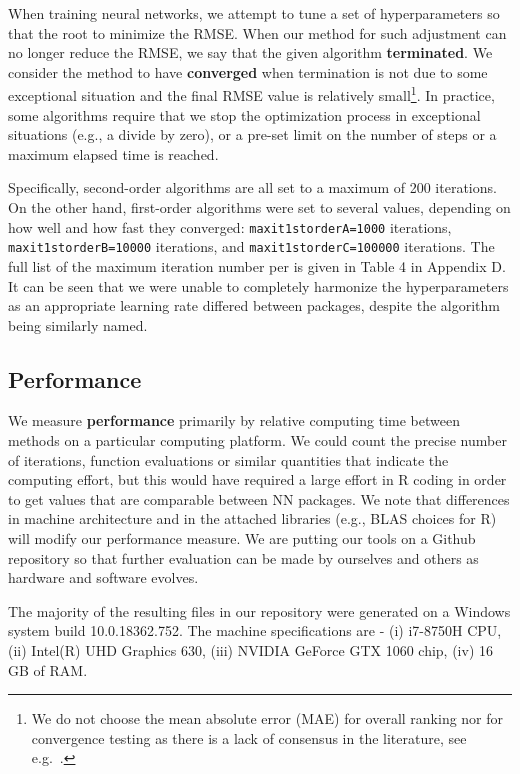 When training neural networks, we attempt to tune a set of
hyperparameters so that the root to minimize the RMSE. When our method
for such adjustment can no longer reduce the RMSE, we say that the given
algorithm \textbf{terminated}. We consider the method to have
\textbf{converged} when termination is not due to some exceptional
situation and the final RMSE value is relatively small\footnote{We do
  not choose the mean absolute error (MAE) for overall ranking nor for
  convergence testing as there is a lack of consensus in the literature,
  see e.g.~\citep{willmott2005advantages,chai2014root}.}. In practice,
some algorithms require that we stop the optimization process in
exceptional situations (e.g., a divide by zero), or a pre-set limit on
the number of steps or a maximum elapsed time is reached.

Specifically, second-order algorithms are all set to a maximum of 200
iterations. On the other hand, first-order algorithms were set to
several values, depending on how well and how fast they converged:
\texttt{maxit1storderA=1000} iterations, \texttt{maxit1storderB=10000}
iterations, and \texttt{maxit1storderC=100000} iterations. The full list
of the maximum iteration number per  is given in
Table 4 in Appendix D. It can be seen that we were unable to completely
harmonize the hyperparameters as an appropriate learning rate differed
between packages, despite the algorithm being similarly named.

\hypertarget{performance}{%
\subsection{Performance}\label{performance}}

We measure \textbf{performance} primarily by relative computing time
between methods on a particular computing platform. We could count the
precise number of iterations, function evaluations or similar quantities
that indicate the computing effort, but this would have required a large
effort in R coding in order to get values that are comparable between NN
packages. We note that differences in machine architecture and in the
attached libraries (e.g., BLAS choices for R) will modify our
performance measure. We are putting our tools on a Github repository so
that further evaluation can be made by ourselves and others as hardware
and software evolves.

The majority of the resulting files in our repository were generated on
a Windows system build 10.0.18362.752. The machine specifications are -
(i) i7-8750H CPU, (ii) Intel(R) UHD Graphics 630, (iii) NVIDIA GeForce
GTX 1060 chip, (iv) 16 GB of RAM.

